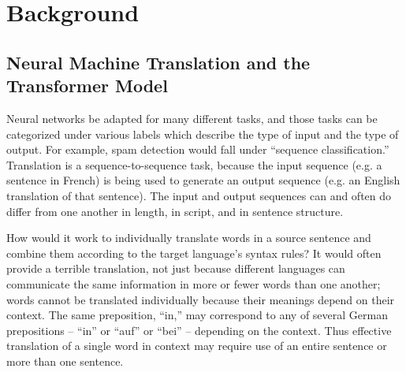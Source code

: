 \chapter{Background}
\label{chap:background}

\section{Neural Machine Translation and the Transformer Model}

Neural networks be adapted for many different tasks, and those tasks can be categorized under various labels which describe the type of input and the type of output. For example, spam detection would fall under “sequence classification.” Translation is a sequence-to-sequence task, because the input sequence (e.g. a sentence in French) is being used to generate an output sequence (e.g. an English translation of that sentence). The input and output sequences can and often do differ from one another in length, in script, and in sentence structure. 

How would it work to individually translate words in a source sentence and combine them according to the target language’s syntax rules? It would often provide a terrible translation, not just because different languages can communicate the same information in more or fewer words than one another; words cannot be translated individually because their meanings depend on their context. The same preposition, “in,” may correspond to any of several German prepositions – “in” or “auf” or “bei” – depending on the context. Thus effective translation of a single word in context may require use of an entire sentence or more than one sentence. 

